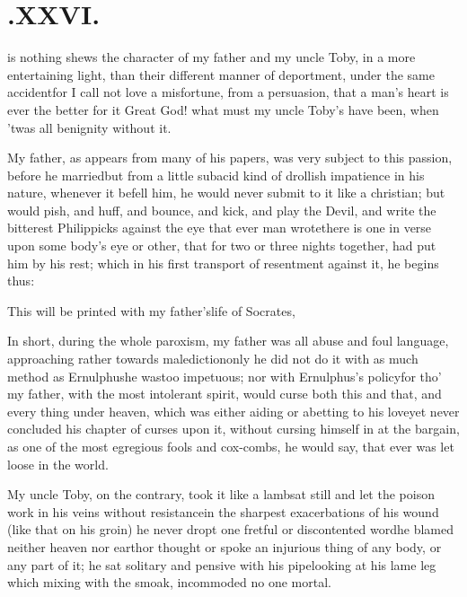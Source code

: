\documentclass[twoside]{article}
\begin{document}
\section{.\enspace XXVI.}

 is nothing shews the cha\-racter
of my father and my uncle Toby, in a more entertaining
light, than their different manner of deportment, under the same
accident\tsh for I call not love a misfortune, from a
persuasion, that a man’s heart is ever the better for
it\break
\tsh Great God! what must my uncle Toby’s
have been, when ’twas all benignity without it.

My father, as appears from many of his papers, was very subject
to this passion, before he married\tsh but from a little
subacid kind of drollish impatience in his nature, whenever it
befell him, he would never submit to it like a christian; but would
pish, and huff, and bounce, and kick, and play the Devil, and write
the bitterest Philippicks against the eye that ever man
wrote\tsh there is one in verse upon some body’s eye
or other, that for two or three nights together, had put him by his
rest; which in his first transport of resentment against it, he
begins thus:

\bigskip
\vbox{\fontsize{8}{10}\selectfont{}}

\bgroup\fontsize{9}{11}\selectfont
\indent\fnast\enspace This will be printed with my
father’s\break life of Socrates, \etc \etc\par
\egroup
{}\eject

In short, during the whole paroxism, my father was all abuse and foul language,
approaching rather towards malediction\tsh only he did not do it with as much method
as Ernulphus\tsh he was\break too impetuous; nor with Ernulphus’s policy\tsh for tho’ my
father, with the most intolerant spirit, would curse both this and that, and every
thing under heaven, which was either aiding or abetting to his love\tsh yet never
concluded his chapter of curses upon it, without cursing himself in at the bargain,
as one of the most egregious fools and cox-\break combs, he would say, that ever was let
loose in the world.

My uncle Toby, on the contrary, took it like a
lamb\tsh sat still and let the poison work in his veins
without resistance\tsh in the sharpest exacerbations of
his wound (like that on his groin) he never dropt one fretful or
discontented word\tsh he blamed neither heaven nor
earth\tsh or thought or spoke an inju\-rious thing of any
body, or any part of it; he sat solitary and pensive with his
pipe\tsh looking at his lame leg \tsh\break 
{}
which mixing with the smoak, incommoded no one
mortal.
\end{document}
